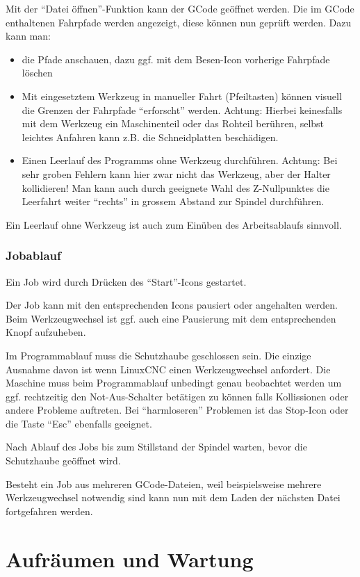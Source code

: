 \documentclass{\basedir/fablab-document}
\begin{document}
Mit der \enquote{Datei öffnen}-Funktion kann der GCode geöffnet werden. Die im GCode enthaltenen Fahrpfade werden angezeigt, diese können nun geprüft werden. Dazu kann man:
\begin{itemize}
	\item die Pfade anschauen, dazu ggf. mit dem Besen-Icon vorherige Fahrpfade löschen
	\item Mit eingesetztem Werkzeug in manueller Fahrt (Pfeiltasten) können visuell die Grenzen der Fahrpfade \enquote{erforscht} werden. Achtung: Hierbei keinesfalls mit dem Werkzeug ein Maschinenteil oder das Rohteil berühren, selbst leichtes Anfahren kann z.B. die Schneidplatten beschädigen.
	\item Einen Leerlauf des Programms ohne Werkzeug durchführen. Achtung: Bei sehr groben Fehlern kann hier zwar nicht das Werkzeug, aber der Halter kollidieren! Man kann auch durch geeignete Wahl des Z-Nullpunktes die Leerfahrt weiter \enquote{rechts} in grossem Abstand zur Spindel durchführen.
\end{itemize}

Ein Leerlauf ohne Werkzeug ist auch zum Einüben des Arbeitsablaufs sinnvoll.

\subsubsection{Jobablauf}

Ein Job wird durch Drücken des \enquote{Start}-Icons gestartet.

Der Job kann mit den entsprechenden Icons pausiert oder angehalten werden. Beim Werkzeugwechsel ist ggf. auch eine Pausierung mit dem entsprechenden Knopf aufzuheben.

Im Programmablauf muss die Schutzhaube geschlossen sein. Die einzige Ausnahme davon ist wenn LinuxCNC einen Werkzeugwechsel anfordert. Die Maschine muss beim Programmablauf unbedingt genau beobachtet werden um ggf. rechtzeitig den Not-Aus-Schalter betätigen zu können falls Kollissionen oder andere Probleme auftreten. Bei \enquote{harmloseren} Problemen ist das Stop-Icon oder die Taste \enquote{Esc} ebenfalls geeignet.

Nach Ablauf des Jobs bis zum Stillstand der Spindel warten, bevor die Schutzhaube geöffnet wird.

Besteht ein Job aus mehreren GCode-Dateien, weil beispielsweise mehrere Werkzeugwechsel notwendig sind kann nun mit dem Laden der nächsten Datei fortgefahren werden.

\newpage
\section{Aufräumen und Wartung}
\end{document}
